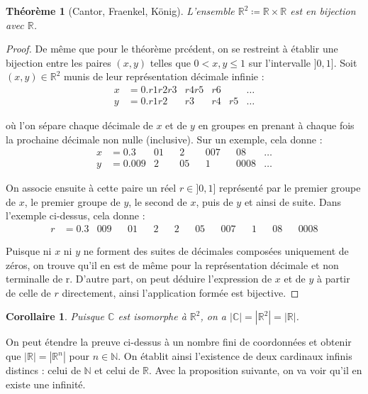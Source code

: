 \documentclass{article}
\theoremstyle{definition}
\theoremstyle{plain}
\newtheorem{theorem}[subsubsection]{Théorème}
\theoremstyle{plain}
\newtheorem{corollary}[subsubsection]{Corollaire}
\theoremstyle{plain}
\theoremstyle{plain}
\begin{document}
\begin{theorem}[Cantor, Fraenkel, König]
	L'ensemble \( \mathbb{R}^{2} \coloneqq \mathbb{R} \times \mathbb{R}\) est en bijection avec \( \mathbb{R} \). \cite{aigner2018proofs} 
\end{theorem}
\begin{proof}
	De même que pour le théorème prcédent, on se restreint à établir une bijection entre les paires \( (x,y) \) telles que \( 0 < x,y \le 1 \) sur l'intervalle \( ]0,1] \).
	Soit \( (x,y) \in \mathbb{R}^{2} \) munis de leur représentation décimale infinie :
	\begin{align*}
		x &= 0.r1r2r3 & r4r5 & r6 & &\ldots\\
		y &= 0.r1r2  & r3 & r4 & r5 &\ldots
	\end{align*}

	où l'on sépare chaque décimale de \( x \) et de \( y \) en groupes en prenant à chaque fois la prochaine décimale non nulle (inclusive). Sur un exemple, cela donne :
	\begin{align*}
		x &= 0.3 & 01 && 2 && 007 && 08 & \ldots\\
		y &= 0.009 & 2 && 05 && 1 && 0008 & \ldots
	\end{align*}

	On associe ensuite à cette paire un réel \( r \in ]0,1] \) représenté par le premier groupe de \( x \), le premier groupe de \( y \), le second de \( x \), puis de \( y \) et ainsi de suite.
	Dans l'exemple ci-dessus, cela donne :
	\begin{align*}
		r &= 0.3 & 009 && 01 && 2 && 2 && 05 && 007 && 1 && 08 && 0008
	\end{align*}

	Puisque ni \( x \) ni \( y \) ne forment des suites de décimales composées uniquement de zéros, on trouve qu'il en est de même pour la représentation décimale et non terminalle de r. 
	D'autre part, on peut déduire l'expression de \( x \) et de \( y \) à partir de celle de \( r \) directement, ainsi l'application formée est bijective.
\end{proof}
\begin{corollary}
	Puisque \( \mathbb{C} \) est isomorphe à \( \mathbb{R}^{2} \), on a \( |\mathbb{C}| = |\mathbb{R}^{2}| = |\mathbb{R}| \).
\end{corollary}

\par On peut étendre la preuve ci-dessus à un nombre fini de coordonnées et obtenir que \( |\mathbb{R}| = |\mathbb{R}^{n}| \) pour \( n \in \mathbb{N} \). \cite{dumoncel2002philosophie}
On établit ainsi l'existence de deux cardinaux infinis distincs : celui de \( \mathbb{N} \) et celui de \( \mathbb{R} \). Avec la proposition suivante, on va voir qu'il en existe une infinité.
\end{document}
